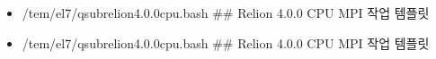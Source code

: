 \documentclass[a4paper,11pt,english]{sphinxmanual}
\begin{document}
\begin{itemize}
\begin{itemize}
\begin{itemize}
\item {} 
\sphinxAtStartPar
/tem/el7/qsub\sphinxhyphen{}relion\sphinxhyphen{}4.0.0\sphinxhyphen{}cpu.bash           \#\# Relion 4.0.0 CPU MPI 작업 템플릿

\item {} 
\sphinxAtStartPar
/tem/el7/qsub\sphinxhyphen{}relion\sphinxhyphen{}4.0.0\sphinxhyphen{}cpu.bash           \#\# Relion 4.0.0 CPU MPI 작업 템플릿

\end{itemize}

\end{itemize}

\end{itemize}

\end{document}
